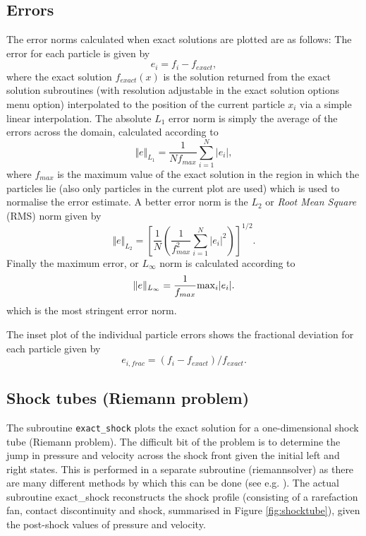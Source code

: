 \documentclass[a4paper,11pt]{article}
\begin{document}
\subsection{Errors}
The error norms calculated when exact solutions are plotted are as follows: The
error for each particle is given by
\begin{equation}
e_i = f_i - f_{exact},
\end{equation}
where the exact solution $f_{exact}(x)$ is the solution returned from the exact
solution subroutines (with resolution adjustable in the exact solution options menu
option) interpolated to the position of the current particle $x_i$ via a simple linear
interpolation. The absolute $L_1$ error norm is simply the average of the errors across
the domain, calculated according to
\begin{equation}
\Vert e \Vert_{L_1} = \frac{1}{N f_{max}} \sum_{i=1}^N \vert e_i \vert,
\end{equation}
where $f_{max}$ is the maximum value of the exact solution in the region in which the
particles lie (also only particles in the current plot are used) which is used to
normalise the error estimate. A better error norm is the $L_2$ or \emph{Root Mean Square}
 (RMS) norm given by
\begin{equation}
\Vert e \Vert_{L_2} = \left[\frac{1}{N} \left( \frac{1}{f_{max}^2} \sum_{i=1}^N \vert e_i
\vert^2 \right)\right]^{1/2}.
\end{equation}
Finally the maximum error, or $L_\infty$ norm is calculated according to
\begin{equation}
\Vert e \Vert_{L_\infty} = \frac{1}{f_{max}} {\rm max}_i \vert e_i \vert.
\end{equation}
which is the most stringent error norm.

 The inset plot of the individual particle errors shows the fractional deviation for
 each particle given by
\begin{equation}
e_{i,frac} = (f_i - f_{exact}) / f_{exact}.
\end{equation}

\subsection{Shock tubes (Riemann problem)}
 The subroutine \verb+exact_shock+ plots the exact solution for a one-dimensional shock tube
(Riemann problem). The difficult bit of the problem is to determine the jump in
pressure and velocity across the shock front given the initial left and right
states. This is performed in a separate subroutine (riemannsolver) as there are 
many different methods by which this can be done (see e.g. \citealt{toro92}). 
The actual subroutine exact\_shock reconstructs the shock profile (consisting of
a rarefaction fan, contact discontinuity and shock, summarised in Figure
\ref{fig:shocktube}), given the post-shock values of pressure and
velocity. 
\end{document}
